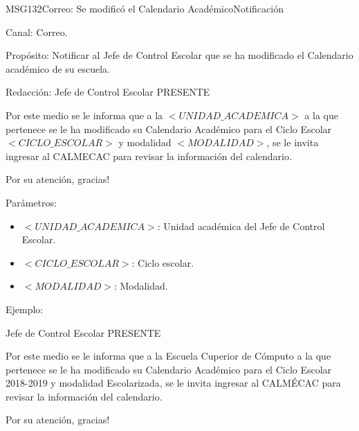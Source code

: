 \begin{mensaje}{MSG132}{Correo: Se modificó el Calendario Académico}{Notificación}
	\item[Canal:] Correo.
	\item[Propósito:] Notificar al Jefe de Control Escolar que se ha modificado el Calendario académico de su escuela.
	\item[Redacción:] \cdtEmpty
	Jefe de Control Escolar
	PRESENTE
 
	Por este medio se le informa que a la $<UNIDAD\_ACADEMICA>$ a la que pertenece se le ha modificado su Calendario Académico para el Ciclo Escolar $<CICLO\_ESCOLAR>$ y modalidad $<MODALIDAD>$, se le invita ingresar al CALMECAC para revisar la información del calendario.

Por su atención, gracias!
	\item[Parámetros:] \cdtEmpty 	
		\begin{itemize}
			\item $<UNIDAD\_ACADEMICA>$: Unidad académica del Jefe de Control Escolar.
			\item $<CICLO\_ESCOLAR>$: Ciclo escolar.
			\item $<MODALIDAD>$: Modalidad.
		\end{itemize}
	\item[Ejemplo:] \cdtEmpty
	
	Jefe de Control Escolar
	PRESENTE
 
	Por este medio se le informa que a la Escuela Cuperior de Cómputo a la que pertenece se le ha modificado su Calendario Académico para el Ciclo Escolar 2018-2019 y modalidad Escolarizada, se le invita ingresar al CALMÉCAC para revisar la información del calendario.

Por su atención, gracias!

\end{mensaje}


